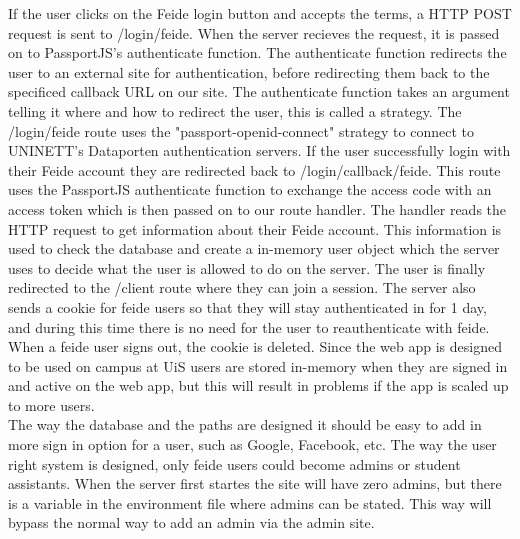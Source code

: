 If the user clicks on the Feide login button and accepts the terms, a HTTP POST request is sent to /login/feide. When the server recieves the request, it is passed on to PassportJS's authenticate function. The authenticate function redirects the user to an external site for authentication, before redirecting them back to the specificed callback URL on our site. The authenticate function takes an argument telling it where and how to redirect the user, this is called a strategy. The /login/feide route uses the "passport-openid-connect" strategy to connect to UNINETT's Dataporten authentication servers. If the user successfully login with their Feide account they are redirected back to /login/callback/feide. This route uses the PassportJS authenticate function to exchange the access code with an access token which is then passed on to our route handler. The handler reads the HTTP request to get information about their Feide account. This information is used to check the database and create a in-memory user object which the server uses to decide what the user is allowed to do on the server. The user is finally redirected to the /client route where they can join a session. The server also sends a cookie for feide users so that they will stay authenticated in for 1 day, and during this time there is no need for the user to reauthenticate with feide. When a feide user signs out, the cookie is deleted. Since the web app is designed to be used on campus at UiS users are stored in-memory when they are signed in and active on the web app, but this will result in problems if the app is scaled up to more users.
\\[11pt]
The way the database and the paths are designed it should be easy to add in more sign in option for a user, such as Google, Facebook, etc. The way the user right system is designed, only feide users could become admins or student assistants. When the server first startes the site will have zero admins, but there is a variable in the environment file where admins can be stated. This way will bypass the normal way to add an admin via the admin site.